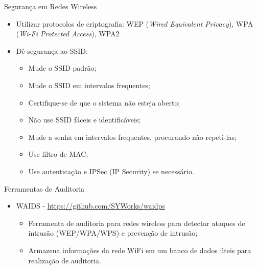 \begin{frame}{Segurança em Redes Wireless}
  
  \begin{itemize}[<+->]
  \item Utilizar protocolos de criptografia: WEP ({\em Wired
      Equivalent Privacy}), WPA ({\em Wi-Fi Protected Access}), WPA2
  \item Dê segurança ao SSID:
\begin{itemize}[<+->]
  \item Mude o SSID padrão;
  \item Mude o SSID em intervalos frequentes;
  \item Certifique-se de que o sistema não esteja aberto;
  \item Não use SSID fáceis e identificáveis;
  \item Mude a senha em intervalos frequentes, procurando não repeti-las;
  \item Use filtro de MAC;
  \item Use autenticação e IPSec (IP Security) se necessário.
\end{itemize}
\end{itemize}

\end{frame}

\begin{frame}{Ferramentas de Auditoria}
  
  \begin{itemize}
  \item WAIDS - \url{https://github.com/SYWorks/waidps}
      \begin{itemize}[<+->]
      \item Ferramenta de auditoria para redes wireless para detectar
        ataques de intrusão (WEP/WPA/WPS) e prevenção de intrusão;
      \item Armazena informações da rede WiFi em um banco de dados
        úteis para realização de auditoria.
\end{itemize}
\end{itemize}

\end{frame}